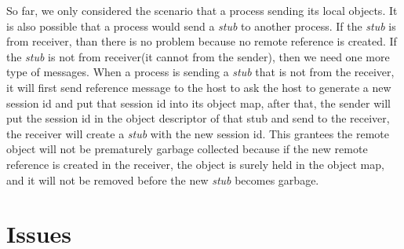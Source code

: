 So far, we only considered the scenario that a process sending its local
objects.
It is also possible that a process would send a \emph{stub} to another process.
If the \emph{stub} is from receiver, than there is no problem because no remote
reference is created.
If the \emph{stub} is not from receiver(it cannot from the sender),
then we need one more type of messages.
When a process is sending a \emph{stub} that is not from the receiver,
it will first send reference message to the host to ask the host
to generate a new session id and put that session id into its object map,
after that, the sender will put the session id in the object descriptor of that 
stub and send to the receiver,
the receiver will create a \emph{stub} with the new session id.
This grantees the remote object will not be prematurely garbage collected 
because if the new remote reference is created in the receiver,
the object is surely held in the object map,
and it will not be removed before the new \emph{stub} becomes garbage.



\section{Issues}

